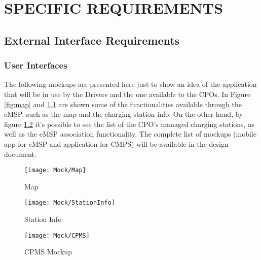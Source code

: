 \newcommand\case{\stepcounter{case}\arabic{case}}
\chapter{SPECIFIC REQUIREMENTS}
\label{ch:specificRequirements}%
\section{External Interface Requirements}
\label{sec:externalInterfaceRequirements}
\subsection{User Interfaces}
\label{subsec:userInterfaces}
The following mockups are presented here just to show an idea of the application
that will be in use by the Drivers and the one available to the CPOs. In Figure \ref{fig:map} and \ref{fig:book} are shown some of the functionalities available through the eMSP, such as the map and the charging station info. On the other hand, by figure \ref{fig:CPMS} it's possible to see the list of the CPO's managed charging stations, as well as the eMSP association functionality. The complete list of mockups (mobile app for eMSP and application for CMPS) will be available in the design document.
\begin{figure}[H]
    \begin{minipage}[t]{.35\textwidth} %
    \texttt{[image: Mock/Map]}
    \caption{Map}
    \label{fig:map}
\end{minipage}
\hfill
\begin{minipage}[t]{.35\textwidth}
    \texttt{[image: Mock/StationInfo]}
    \caption{Station Info}
    \label{fig:book}
\end{minipage}
\end{figure}
\begin{figure}[H]
            \begin{center}
            \texttt{[image: Mock/CPMS]}
            \caption{CPMS Mockup}
            \label{fig:CPMS}
            \end{center}
        \end{figure}
